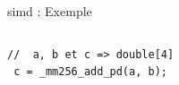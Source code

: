 \documentclass[../main.tex]{subfiles}
\begin{document}
\begin{frame}[fragile]{\acrshort{simd} : Exemple}
\begin{columns}
\begin{column}{.45\linewidth}
\begin{overlayarea}{\linewidth}{.4\textheight}
        \begin{lstlisting}[title={SIMD en C (Intel, double $64$-bit)},style=cstyle,basicstyle=\scriptsize]
 //  a, b et c => double[4]
 c = _mm256_add_pd(a, b);\end{lstlisting}
      \end{overlayarea}
    \end{column}
  \end{columns}
\end{frame}
\end{document}
